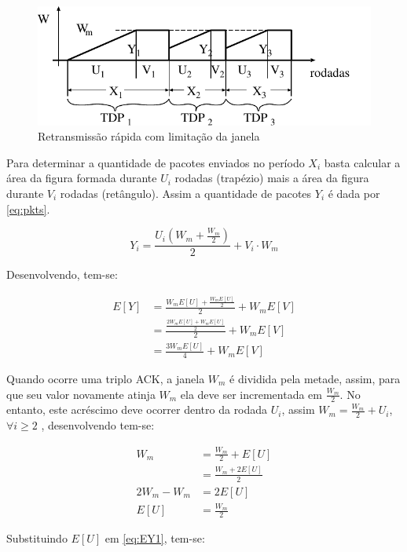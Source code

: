 \begin{figure}[ht]
  \centering
  \includegraphics[scale=0.8]{figs/limit.pdf}
  \caption{Retransmissão rápida com limitação da janela}
  \label{fig:limit}
\end{figure}

Para determinar a quantidade de pacotes enviados no período $X_i$ basta calcular a área da figura formada durante $U_i$ rodadas (trapézio) mais a área da figura durante $V_i$ rodadas (retângulo). Assim a quantidade de pacotes $Y_i$ é dada por \ref{eq:pkts}.

\begin{equation} \label{eq:pkts}
Y_i=\frac{U_i(W_m + \frac{W_m}{2})}{2} + V_i \cdot W_m
\end{equation}

Desenvolvendo, tem-se:

\begin{align} \label{eq:EY1}
  \nonumber E[Y] &= \frac{W_mE[U]+\frac{W_mE[U]}{2}}{2} + W_mE[V]\\
  \nonumber     &= \frac{\frac{2W_mE[U]+W_mE[U]}{2}}{2} + W_mE[V]\\
       &= \frac{3W_mE[U]}{4} + W_mE[V]
\end{align}

Quando ocorre uma triplo ACK, a janela $W_m$ é dividida pela metade, assim, para que seu valor novamente atinja $W_m$ ela deve ser incrementada em $\frac{W_m}{2}$. No entanto, este acréscimo deve ocorrer dentro da rodada $U_i$, assim $W_m = \frac{W_m}{2} + U_i$, $\forall i \geq 2$ , desenvolvendo tem-se:

\begin{align} \label{eq:EY2}
  \nonumber W_m &= \frac{W_m}{2} + E[U]\\
  \nonumber     &= \frac{W_m+2E[U]}{2}\\
  \nonumber	2W_m - W_m &= 2E[U]\\
      E[U] &= \frac{W_m}{2}
\end{align} 

Substituindo $E[U]$ em \ref{eq:EY1}, tem-se:

